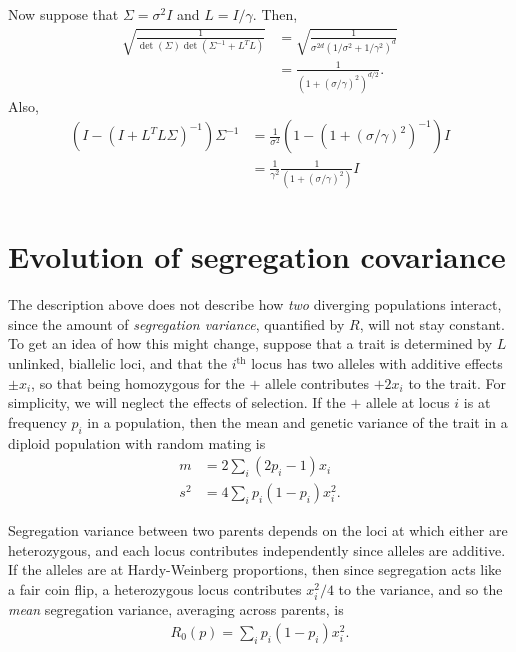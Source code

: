 \documentclass{article}
\newcommand{\1}{\mathbbm{1}}
\begin{document}
Now suppose that $\Sigma = \sigma^2 I$ and $L = I/\gamma$.
Then,
\begin{align*}
    \sqrt{\frac{1}{\det(\Sigma)\det(\Sigma^{-1}+L^TL)}}
    &=
    \sqrt{\frac{1}{\sigma^{2d} (1/\sigma^2 + 1/\gamma^2)^d}} \\
    &=
    \frac{1}{(1+ \left(\sigma/\gamma\right)^2)^{d/2}} .
\end{align*}
Also, 
\begin{align*}
        \left( I - (I + L^T L \Sigma)^{-1} \right) \Sigma^{-1} 
        &=
        \frac{1}{\sigma^2}\left( 1 - (1 + (\sigma/\gamma)^2)^{-1} \right) I \\
        &=
        \frac{1}{\gamma^2}\frac{1}{(1 + (\sigma/\gamma)^2)} I \\
\end{align*}


\section{Evolution of segregation covariance}
\label{apx:seg_cov}

The description above does not describe how \emph{two} diverging populations interact,
since the amount of \emph{segregation variance}, quantified by $R$,
will not stay constant.
To get an idea of how this might change,
suppose that a trait is determined by $L$ unlinked, biallelic loci,
and that the $i^\mathrm{th}$ locus has two alleles with additive effects $\pm x_i$,
so that being homozygous for the $+$ allele contributes $+2x_i$ to the trait.
For simplicity, we will neglect the effects of selection.
If the $+$ allele at locus $i$ is at frequency $p_i$ in a population,
then the mean and genetic variance of the trait in a diploid population with random mating is
\begin{align*}
    m &= 2 \sum_i (2 p_i - 1) x_i \\
    s^2 &= 4 \sum_i p_i (1-p_i) x_i^2 .
\end{align*}


Segregation variance between two parents depends on the loci at which either are heterozygous,
and each locus contributes independently
since alleles are additive.
If the alleles are at Hardy-Weinberg proportions,
then since segregation acts like a fair coin flip, a heterozygous locus contributes $x_i^2/4$ to the variance,
and so the \emph{mean} segregation variance, averaging across parents, is
\begin{align*}
    R_0(p) = \sum_i p_i (1-p_i) x_i^2 .
\end{align*}
\end{document}
